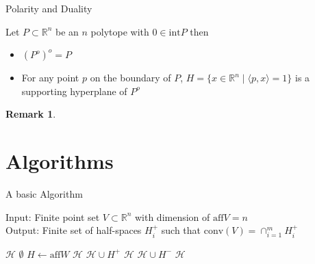 \documentclass[9pt]{beamer}
\newcommand\R{\mathbb{R}}
\newcommand\set[1]{\{#1\}}
\theoremstyle{definition}
\newtheorem*{remark}{Remark}
\begin{document}
\begin{frame}[fragile]{Polarity and Duality}
  \begin{theorem}
    Let $P \subset \R^n$ be an $n$ polytope with $0 \in \text{int}P$ then
    \begin{itemize}
    \item $(P^o)^o = P$
    \item For any point $p$ on the boundary of $P$, $H = \set{x \in \R^n
      \mid \langle p, x \rangle = 1}$ is a supporting hyperplane of $P^o$
    \end{itemize}
  \end{theorem}
  \begin{remark}
    
  \end{remark}
  
\end{frame}

\section{Algorithms}

\begin{frame}[fragile]{A basic Algorithm}
  
  \begin{algorithm}[H]
    Input: Finite point set $V \subset \R^n$ with dimension of $\text{aff}V = n$\\
    Output: Finite set of half-spaces $H_i^+$ such that $\text{conv}(V) =
    \cap_{i=1}^m H_i^+$
    \begin{algorithmic}[1]
      \STATE $\mathcal{H}$ \leftarrow $\emptyset$
      \STATE $H \leftarrow \text{aff} W$
      \STATE $\mathcal{H}$ \leftarrow $\mathcal{H} \cup H^+$
      \ELSE $\mathcal{H}$ \leftarrow $\mathcal{H} \cup H^-$
      \ENDIF
      \ENDFOR
      \RETURN $\mathcal{H}$
    \end{algorithmic}
  \end{algorithm}
\end{frame}
\end{document}
